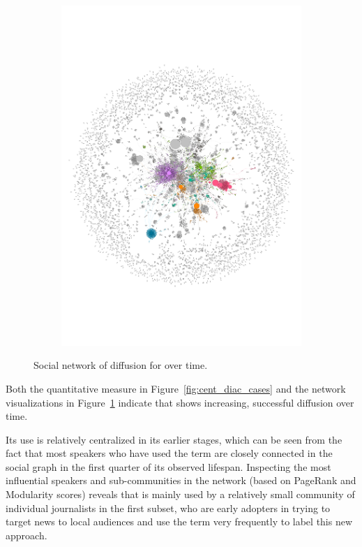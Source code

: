 \documentclass[
  a4paper,
  abstract=on,
  captions=tableabove
  ]{scrartcl}
\begin{document}
\begin{figure}
\begin{subfigure}{.45\linewidth}
          \includegraphics[width=\linewidth, height=\textheight, keepaspectratio]{img/net_hyperlocal_four.pdf}
        \end{subfigure}
        \caption[Social networks of diffusion for ]{Social network of diffusion for  over time.}
        \label{fig:net_diac_hyperlocal}
      \end{figure}

      Both the quantitative measure in Figure~\ref{fig:cent_diac_cases} and the network visualizations in Figure~\ref{fig:net_diac_hyperlocal} indicate that  shows increasing, successful diffusion over time.

      Its use is relatively centralized in its earlier stages, which can be seen from the fact that most speakers who have used the term are closely connected in the social graph in the first quarter of its observed lifespan. Inspecting the most influential speakers and sub-communities in the network (based on PageRank and Modularity scores) reveals that  is mainly used by a relatively small community of individual journalists in the first subset, who are early adopters in trying to target news to local audiences and use the term very frequently to label this new approach.
\end{document}
